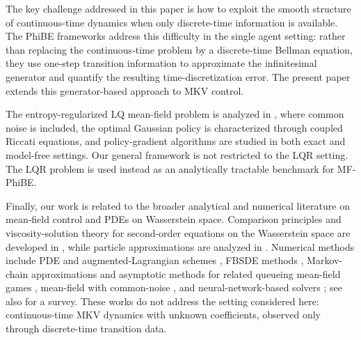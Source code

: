 \documentclass[a4paper, 10pt, english, reqno]{amsart}
\begin{document}
The key challenge addressed in this paper is how to exploit the smooth structure of continuous-time dynamics when only discrete-time information is available. 
The PhiBE frameworks \cite{zhu2024phibe,zhu2025optimalphibe} address this difficulty in the single agent setting: rather than replacing the continuous-time problem by a discrete-time Bellman equation, they use one-step transition information to approximate the infinitesimal generator and quantify the resulting time-discretization error. The present paper extends this generator-based approach to MKV control. 






The entropy-regularized LQ mean-field problem is analyzed in \cite{frikha2024full}, where common noise is included, the optimal Gaussian policy is characterized through coupled Riccati equations, and policy-gradient algorithms are studied in both exact and model-free settings. Our general framework is not restricted to the LQR setting. The LQR problem is used instead as an analytically tractable benchmark for MF-PhiBE.




Finally, our work is related to the broader analytical and numerical literature on mean-field control and PDEs on Wasserstein space. Comparison principles and viscosity-solution theory for second-order equations on the Wasserstein space are developed in \cite{BayraktarEkrenZhangCPDE2025,BayraktarEkrenHeZhangJDE2026}, while particle approximations are analyzed in \cite{BayraktarEkrenZhangParticleSICON2025}. Numerical methods include PDE and augmented-Lagrangian schemes \cite{AchdouLauriereCongestionI,AchdouLauriereCongestionII}, FBSDE methods \cite{chassagneux2019}, Markov-chain approximations and asymptotic methods for related queueing mean-field games \cite{BayraktarBudhirajaCohenAAP,BudhirajaCohenBayraktar2018}, mean-field with common-noise \cite{RenWeiYuZhouCommonNoiseI,RenWeiYuZhouCommonNoiseII}, and neural-network-based solvers \cite{ruthotto2020,Carmona2022,soner2025learning}; see also \cite{lauriere2021} for a survey. These works do not address the setting considered here: continuous-time MKV dynamics with unknown coefficients, observed only through discrete-time transition data. 

\end{document}

